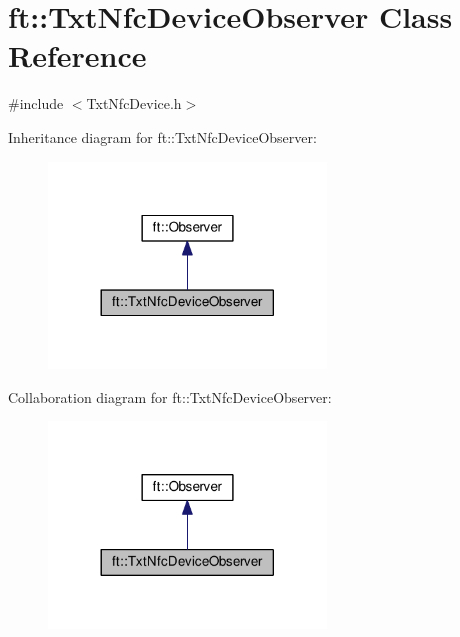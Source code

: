 \hypertarget{classft_1_1_txt_nfc_device_observer}{}\section{ft\+:\+:Txt\+Nfc\+Device\+Observer Class Reference}
\label{classft_1_1_txt_nfc_device_observer}


{\ttfamily \#include $<$Txt\+Nfc\+Device.\+h$>$}



Inheritance diagram for ft\+:\+:Txt\+Nfc\+Device\+Observer\+:
\nopagebreak
\begin{figure}[H]
\begin{center}
\leavevmode
\includegraphics[width=209pt]{classft_1_1_txt_nfc_device_observer__inherit__graph}
\end{center}
\end{figure}


Collaboration diagram for ft\+:\+:Txt\+Nfc\+Device\+Observer\+:
\nopagebreak
\begin{figure}[H]
\begin{center}
\leavevmode
\includegraphics[width=209pt]{classft_1_1_txt_nfc_device_observer__coll__graph}
\end{center}
\end{figure}

